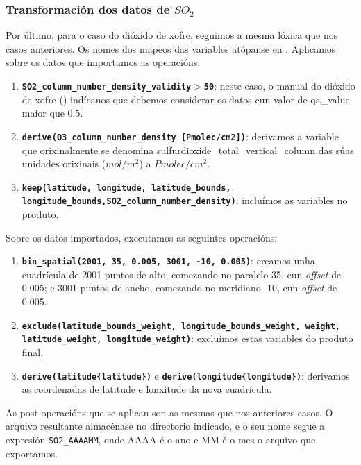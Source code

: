 \subsubsection{Transformación dos datos de $SO_2$}
Por último, para o caso do dióxido de xofre, seguimos a mesma lóxica que nos casos anteriores. Os nomes dos mapeos das variables atópanse en \cite{HARPSO2}. Aplicamos sobre os datos que importamos
as operacións:
\begin{enumerate}
    \item \texttt{\textbf{SO2\_column\_number\_density\_validity$>$50}}: neste caso, o manual do dióxido de xofre (\cite{SO2manual}) indícanos que debemos considerar os datos cun
    valor de qa\_value maior que 0.5.
    \item \texttt{\textbf{derive(O3\_column\_number\_density [Pmolec/cm2])}}: derivamos a variable que orixinalmente se denomina sulfurdioxide\_total\_vertical\_column das súas
    unidades orixinais ($mol/m^2$) a $Pmolec/cm^2$.
    \item \texttt{\textbf{keep(latitude, longitude, latitude\_bounds, longitude\_bounds,\break SO2\_column\_number\_density)}}: incluímos as variables no produto.
\end{enumerate}

Sobre os datos importados, executamos as seguintes operacións:
\begin{enumerate}
    \item \texttt{\textbf{bin\_spatial(2001, 35, 0.005, 3001, -10, 0.005)}}: creamos unha cuadrícula de 2001 puntos de alto, comezando no paralelo 35\textdegree, cun \textit{offset} de 0.005\textdegree;
    e 3001 puntos de ancho, comezando no meridiano -10\textdegree, cun \textit{offset} de 0.005.
    \item \texttt{\textbf{exclude(latitude\_bounds\_weight, longitude\_bounds\_weight, weight, latitude\_weight, longitude\_weight)}}: excluímos estas variables do produto final.
    \item \texttt{\textbf{derive(latitude\{latitude\})}} e  \texttt{\textbf{derive(longitude\{longitude\})}}: derivamos as coordenadas de latitude e lonxitude da nova cuadrícula.
\end{enumerate}

As post-operacións que se aplican son as mesmas que nos anteriores casos. O arquivo resultante almacénase no directorio indicado, e o seu nome segue a expresión \texttt{SO2\_AAAAMM},
onde AAAA é o ano e MM é o mes o arquivo que exportamos.



